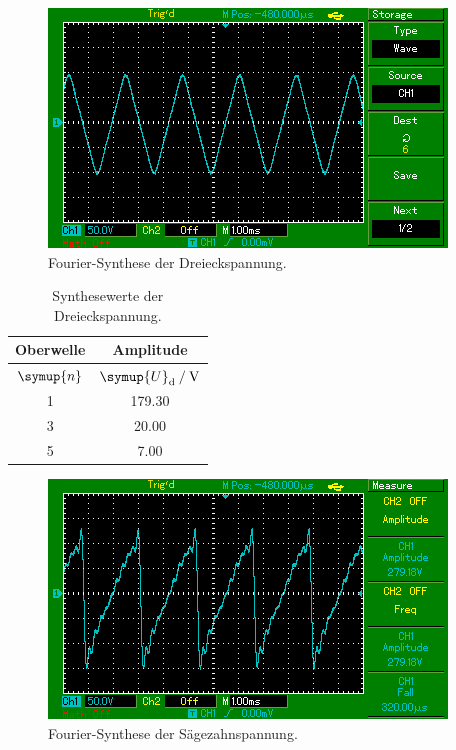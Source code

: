 \begin{figure}
  \centering
  \includegraphics[width=\textwidth]{content/dreieck.jpg}
  \caption{Fourier-Synthese der Dreieckspannung.}
  \label{fig:dreieck}
\end{figure}

\begin{table}
  \centering
  \caption{Synthesewerte der Dreieckspannung.}
  \label{tab:dreieckwerte}
  \begin{tabular}
    { S[table-format=1.0] S[table-format=3.2] }
    \toprule
    {Oberwelle} & {Amplitude} \\
    \hline
    $\symup{n}$ & $\symup{U}_\text{d} \:/\: \si{\volt}$ \\
     & 179.30 \\
    3 &  20.00 \\
    5 &   7.00 \\
    \bottomrule
  \end{tabular}
\end{table}

\begin{figure}
  \centering
  \includegraphics[width=\textwidth]{content/saegezahn.jpg}
  \caption{Fourier-Synthese der Sägezahnspannung.}
  \label{fig:saege}
\end{figure}

